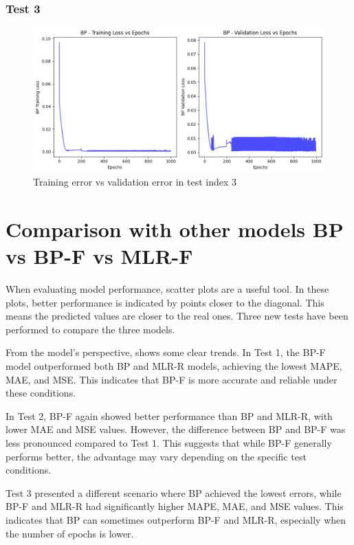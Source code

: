 \documentclass[11pt, a4paper]{article}
\begin{document}
\subsubsection{Test 3}

\begin{figure}[H]
    \centering
    \includegraphics[width=400pt]{images/test3_error.png}
    \caption{Training error vs validation error in test index 3}
    \label{fig:image_error_test_3}
\end{figure}

\newpage

\section{Comparison with other models BP vs BP-F vs MLR-F}

When evaluating model performance, scatter plots are a useful tool. In these plots, better performance is indicated by points closer to the diagonal. 
This means the predicted values are closer to the real ones. Three new tests have been performed to compare the three models.

\vspace{1em}From the model's perspective, shows some clear trends. In Test 1, the BP-F model outperformed both BP and MLR-R models, achieving the lowest MAPE, MAE, and MSE. 
This indicates that BP-F is more accurate and reliable under these conditions.

\vspace{1em}In Test 2, BP-F again showed better performance than BP and MLR-R, with lower MAE and MSE values. However, the difference between BP and BP-F was less pronounced 
compared to Test 1. This suggests that while BP-F generally performs better, the advantage may vary depending on the specific test conditions.

\vspace{1em}Test 3 presented a different scenario where BP achieved the lowest errors, while BP-F and MLR-R had significantly higher MAPE, MAE, and MSE values. 
This indicates that BP can sometimes outperform BP-F and MLR-R, especially when the number of epochs is lower. 
\end{document}
